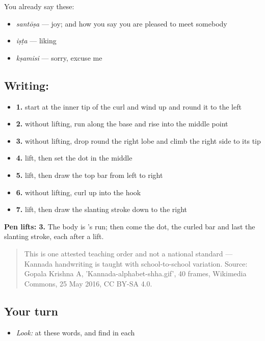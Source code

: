 You already say these:

\begin{itemize}
\raggedright
  \item \textbf{} \emph{santōṣa} — joy; and how you say you are pleased to meet somebody
  \item \textbf{} \emph{iṣṭa} — liking
  \item \textbf{} \emph{kṣamisi} — sorry, excuse me
\end{itemize}

\subsection*{Writing: }

\begin{itemize}
\raggedright
  \item \textbf{1.} start at the inner tip of the curl and wind up and round it to the left
  \item \textbf{2.} without lifting, run along the base and rise into the middle point
  \item \textbf{3.} without lifting, drop round the right lobe and climb the right side to its tip
  \item \textbf{4.} lift, then set the dot in the middle
  \item \textbf{5.} lift, then draw the top bar from left to right
  \item \textbf{6.} without lifting, curl up into the hook
  \item \textbf{7.} lift, then draw the slanting stroke down to the right
\end{itemize}

\textbf{Pen lifts: 3.} The body is 's run; then come the dot, the curled bar and last the slanting stroke, each after a lift.

\begin{quote}
This is one attested teaching order and not a national standard — Kannada handwriting is taught with school-to-school variation. Source: Gopala Krishna A, 'Kannada-alphabet-shha.gif', 40 frames, Wikimedia Commons, 25 May 2016, CC BY-SA 4.0.
\end{quote}

\subsection*{Your turn}
\begin{itemize}
\raggedright
  \item \emph{Look:} at these words, and find  in each
\end{itemize}

